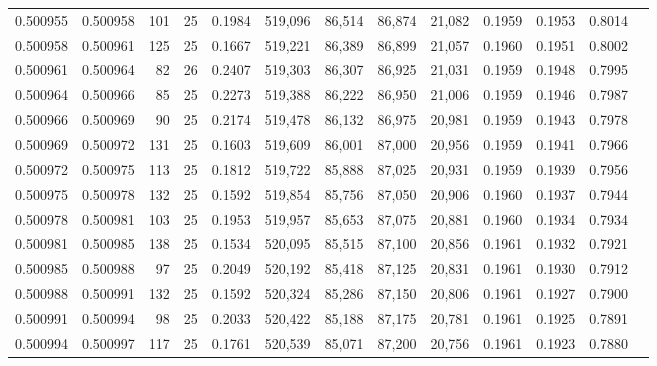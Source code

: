\begin{tabular}{rrrrrrrrrrrrr}
0.500955 & 0.500958 & 101 &  25 &                                     0.1984 & 519,096 &  86,514 &  86,874 &  21,082 & 0.1959 & 0.1953 & 0.8014 \\
0.500958 & 0.500961 & 125 &  25 &                                     0.1667 & 519,221 &  86,389 &  86,899 &  21,057 & 0.1960 & 0.1951 & 0.8002 \\
0.500961 & 0.500964 &  82 &  26 &                                     0.2407 & 519,303 &  86,307 &  86,925 &  21,031 & 0.1959 & 0.1948 & 0.7995 \\
0.500964 & 0.500966 &  85 &  25 &                                     0.2273 & 519,388 &  86,222 &  86,950 &  21,006 & 0.1959 & 0.1946 & 0.7987 \\
0.500966 & 0.500969 &  90 &  25 &                                     0.2174 & 519,478 &  86,132 &  86,975 &  20,981 & 0.1959 & 0.1943 & 0.7978 \\
0.500969 & 0.500972 & 131 &  25 &                                     0.1603 & 519,609 &  86,001 &  87,000 &  20,956 & 0.1959 & 0.1941 & 0.7966 \\
0.500972 & 0.500975 & 113 &  25 &                                     0.1812 & 519,722 &  85,888 &  87,025 &  20,931 & 0.1959 & 0.1939 & 0.7956 \\
0.500975 & 0.500978 & 132 &  25 &                                     0.1592 & 519,854 &  85,756 &  87,050 &  20,906 & 0.1960 & 0.1937 & 0.7944 \\
0.500978 & 0.500981 & 103 &  25 &                                     0.1953 & 519,957 &  85,653 &  87,075 &  20,881 & 0.1960 & 0.1934 & 0.7934 \\
0.500981 & 0.500985 & 138 &  25 &                                     0.1534 & 520,095 &  85,515 &  87,100 &  20,856 & 0.1961 & 0.1932 & 0.7921 \\
0.500985 & 0.500988 &  97 &  25 &                                     0.2049 & 520,192 &  85,418 &  87,125 &  20,831 & 0.1961 & 0.1930 & 0.7912 \\
0.500988 & 0.500991 & 132 &  25 &                                     0.1592 & 520,324 &  85,286 &  87,150 &  20,806 & 0.1961 & 0.1927 & 0.7900 \\
0.500991 & 0.500994 &  98 &  25 &                                     0.2033 & 520,422 &  85,188 &  87,175 &  20,781 & 0.1961 & 0.1925 & 0.7891 \\
0.500994 & 0.500997 & 117 &  25 &                                     0.1761 & 520,539 &  85,071 &  87,200 &  20,756 & 0.1961 & 0.1923 & 0.7880 \\

\end{tabular}
